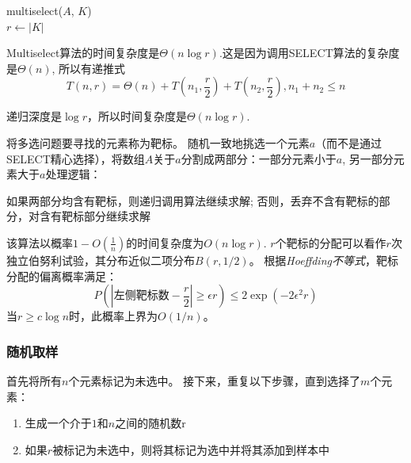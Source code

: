 \documentclass[./../main.tex]{subfiles} %
\begin{document}
\begin{algorithm}
    \SetAlgoLined
    \BlankLine
    multiselect($A$, $K$)\\
    $r\leftarrow |K|$\\
    \caption{Multiselect}
\end{algorithm}
Multiselect算法的时间复杂度是$\Theta(n\log r)$.这是因为调用SELECT算法的复杂度是$\Theta(n)$, 所以有递推式
$$
T(n, r)= \Theta(n) + T(n_1, \frac{r}{2}) + T(n_2, \frac{r}{2}), n_1+n_2\le n
$$

递归深度是$\log r$，所以时间复杂度是$\Theta(n\log r)$.

将多选问题要寻找的元素称为靶标。
随机一致地挑选一个元素$a$（而不是通过SELECT精心选择），将数组$A$关于$a$分割成两部分：一部分元素小于$a$, 另一部分元素大于$a$
​处理逻辑：​​

如果两部分均含有靶标，则递归调用算法继续求解;
否则，丢弃不含有靶标的部分，对含有靶标部分继续求解

该算法以概率$1-O(\frac{1}{n})$的时间复杂度为$O(n\log r)$.
$r$个靶标的分配可以看作$r$次独立伯努利试验，其分布近似​二项分布$​B(r,1/2)$。
根据\emph{Hoeffding不等式}，靶标分配的偏离概率满足：
$$
P\left(\left|\text{左侧靶标数} - \frac{r}{2}\right| \geq \epsilon r\right) \leq 2\exp\left(-2\epsilon^2 r\right)
$$
当$r \geq c\log n$时，此概率上界为$O(1/n)$。

\subsubsection{随机取样}
首先将所有$n$个元素标记为未选中。
接下来，重复以下步骤，直到选择了$m$个元素：
\begin{enumerate}
    \item 生成一个介于$1$和$n$之间的随机数r
    \item 如果$r$被标记为未选中，则将其标记为选中并将其添加到样本中
\end{enumerate}
\end{document}
